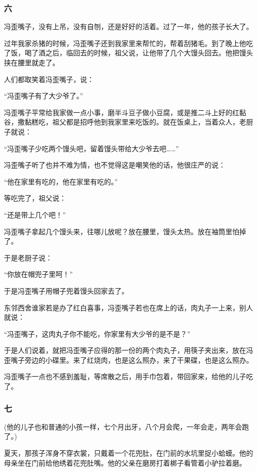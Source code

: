 \subsubsection*{六}
\par 冯歪嘴子，没有上吊，没有自刎，还是好好的活着。过了一年，他的孩子长大了。
\par 过年我家杀猪的时候，冯歪嘴子还到我家里来帮忙的，帮着刮猪毛。到了晚上他吃了饭，喝了酒之后，临回去的时候，祖父说，让他带了几个大馒头回去。他把馒头挟在腰里就走了。
\par 人们都取笑着冯歪嘴子，说：
\par “冯歪嘴子有了大少爷了。”
\par 冯歪嘴子平常给我家做一点小事，磨半斗豆子做小豆腐，或是推二斗上好的红黏谷，撒黏糕吃，祖父都是招呼他到我家里来吃饭的。就在饭桌上，当着众人，老厨子就说：
\par “冯歪嘴子少吃两个馒头吧，留着馒头带给大少爷去吧……”
\par 冯歪嘴子听了也并不难为情，也不觉得这是嘲笑他的话，他很庄严的说：
\par “他在家里有吃的，他在家里有吃的。”
\par 等吃完了，祖父说：
\par “还是带上几个吧！”
\par 冯歪嘴子拿起几个馒头来，往哪儿放呢？放在腰里，馒头太热。放在袖筒里怕掉了。
\par 于是老厨子说：
\par “你放在帽兜子里呵！”
\par 于是冯歪嘴子用帽子兜着馒头回家去了。
\par 东邻西舍谁家若是办了红白喜事，冯歪嘴子若也在席上的话，肉丸子一上来，别人就说：
\par “冯歪嘴子，这肉丸子你不能吃，你家里有大少爷的是不是？”
\par 于是人们说着，就把冯歪嘴子应得的那一份的两个肉丸子，用筷子夹出来，放在冯歪嘴子旁边的小碟里。来了红烧肉，也是这么照办，来了干果碟，也是这么照办。
\par 冯歪嘴子一点也不感到羞耻，等席散之后，用手巾包着，带回家来，给他的儿子吃了。
\subsubsection*{七}
\par (他的儿子也和普通的小孩一样，七个月出牙，八个月会爬，一年会走，两年会跑了。)
\par 夏天，那孩子浑身不穿衣裳，只戴着一个花兜肚，在门前的水坑里捉小蛤蟆。他的母亲坐在门前给他绣着花兜肚嘴。他的父亲在磨房打着梆子看管着小驴拉着磨。
